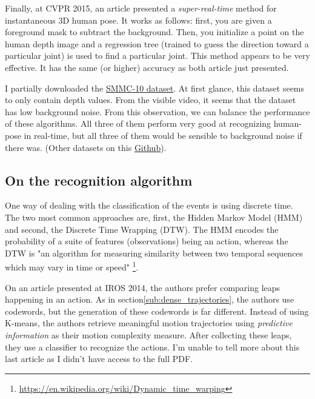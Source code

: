 \documentclass[a4paper]{article}
\begin{document}
			Finally, at CVPR 2015\cite{yub2015random}, an article presented a \textit{super-real-time} method for instantaneous 3D human pose. It works as follows: first, you are given a foreground mask to subtract the background. Then, you initialize a point on the human depth image and a regression tree (trained to guess the direction toward a particular joint) is used to find a particular joint. This method appears to be very effective. It has the same (or higher) accuracy as both article just presented. 

			\begin{mdframed}[backgroundcolor = gray!30]
				I partially downloaded the \href{http://ai.stanford.edu/~varung/cvpr10/}{SMMC-10 dataset}. At first glance, this dataset seems to only contain depth values. From the visible video, it seems that the dataset has low background noise. From this observation, we can balance the performance of these algorithms. All three of them perform very good at recognizing human-pose in real-time, but all three of them would be sensible to background noise if there was. (Other datasets on this \href{https://github.com/colincsl/RGBD-Dataset-Reader}{Github}).
			\end{mdframed}



		\subsection{On the recognition algorithm}
		\label{sub:reco_algo}
			One way of dealing with the classification of the events is using discrete time. The two most common approaches are, first, the Hidden Markov Model (HMM) and second, the Discrete Time Wrapping (DTW). The HMM encodes the probability of a suite of features (observations) being an action, whereas the DTW is "an algorithm for measuring similarity between two temporal sequences which may vary in time or speed" \footnote{\url{https://en.wikipedia.org/wiki/Dynamic_time_warping}}.

			On an article\cite{kwon2014complexity} presented at IROS 2014, the authors prefer comparing leaps happening in an action. As in section\ref{sub:dense_trajectories}, the authors use codewords, but the generation of these codewords is far different. Instead of using K-means, the authors retrieve meaningful motion trajectories using \textit{predictive information}\cite{bialek2001predictability} as their motion complexity measure. After collecting these leaps, they use a classifier to recognize the actions. I'm unable to tell more about this last article as I didn't have access to the full PDF.
\end{document}
